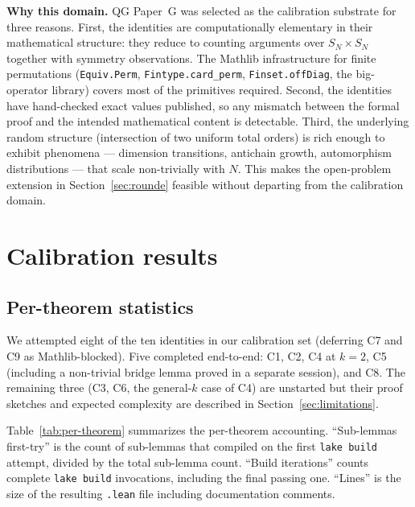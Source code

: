 \documentclass[11pt]{article}
\theoremstyle{definition}
\begin{document}
\textbf{Why this domain.} QG Paper~G was selected as the calibration substrate
for three reasons. First, the identities are computationally elementary in their
mathematical structure: they reduce to counting arguments over $S_N \times S_N$
together with symmetry observations. The Mathlib infrastructure for finite
permutations (\texttt{Equiv.Perm}, \texttt{Fintype.card\_perm},
\texttt{Finset.offDiag}, the big-operator library) covers most of the primitives
required. Second, the identities have hand-checked exact values published, so any
mismatch between the formal proof and the intended mathematical content is
detectable. Third, the underlying random structure (intersection of two uniform
total orders) is rich enough to exhibit phenomena --- dimension transitions,
antichain growth, automorphism distributions --- that scale non-trivially with
$N$. This makes the open-problem extension in Section~\ref{sec:rounde} feasible
without departing from the calibration domain.

\section{Calibration results}\label{sec:calibration}

\subsection{Per-theorem statistics}

We attempted eight of the ten identities in our calibration set (deferring C7 and
C9 as Mathlib-blocked). Five completed end-to-end: C1, C2, C4 at $k=2$, C5
(including a non-trivial bridge lemma proved in a separate session), and C8.
The remaining three (C3, C6, the general-$k$ case of C4) are unstarted but their
proof sketches and expected complexity are described in Section~\ref{sec:limitations}.

Table~\ref{tab:per-theorem} summarizes the per-theorem accounting. ``Sub-lemmas
first-try'' is the count of sub-lemmas that compiled on the first \texttt{lake build}
attempt, divided by the total sub-lemma count. ``Build iterations'' counts complete
\texttt{lake build} invocations, including the final passing one. ``Lines'' is the
size of the resulting \texttt{.lean} file including documentation comments.
\end{document}
